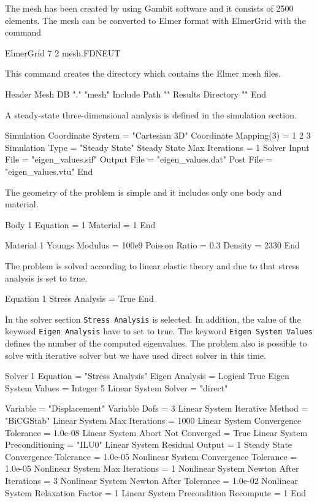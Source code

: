 The mesh has been created by using Gambit software and it consists of 2500 elements. The mesh can be converted to Elmer format with ElmerGrid with the command

\ttbegin
ElmerGrid 7 2 mesh.FDNEUT
\ttend

\begin{flushleft}
This command creates the directory which contains the Elmer mesh files.


\ttbegin
Header
  Mesh DB "." "mesh"
  Include Path ""
  Results Directory ""
End
\ttend

A steady-state three-dimensional analysis is defined in the simulation section.

\ttbegin
Simulation
  Coordinate System = "Cartesian 3D"
  Coordinate Mapping(3) = 1 2 3
  Simulation Type = "Steady State"
  Steady State Max Iterations = 1
  Solver Input File = "eigen_values.sif"
  Output File = "eigen_values.dat"
  Post File = "eigen_values.vtu"
End
\ttend 

The geometry of the problem is simple and it includes only one body and material. 

\ttbegin
Body 1
  Equation = 1
  Material = 1
End

Material 1
  Youngs Modulus = 100e9
  Poisson Ratio = 0.3
  Density = 2330
End
\ttend

The problem is solved according to linear elastic theory and due to that stress analysis is set to true.

\ttbegin
Equation 1
  Stress Analysis = True
End
\ttend

In the solver section {\tt Stress Analysis} is selected. In addition, the value of the keyword 
{\tt Eigen Analysis} have to set to true. The keyword {\tt Eigen System Values} defines the number of the computed eigenvalues. The problem also is possible to solve with iterative solver but we have used direct solver in this time.

\ttbegin
Solver 1
  Equation = "Stress Analysis"
  Eigen Analysis = Logical True
  Eigen System Values = Integer 5
  Linear System Solver = "direct"

  Variable = "Displacement"
  Variable Dofs = 3
  Linear System Iterative Method = "BiCGStab"
  Linear System Max Iterations = 1000
  Linear System Convergence Tolerance = 1.0e-08
  Linear System Abort Not Converged = True
  Linear System Preconditioning = "ILU0"
  Linear System Residual Output = 1
  Steady State Convergence Tolerance = 1.0e-05
  Nonlinear System Convergence Tolerance = 1.0e-05
  Nonlinear System Max Iterations = 1
  Nonlinear System Newton After Iterations = 3
  Nonlinear System Newton After Tolerance = 1.0e-02
  Nonlinear System Relaxation Factor = 1
  Linear System Precondition Recompute = 1
End
\ttend


\end{flushleft}
